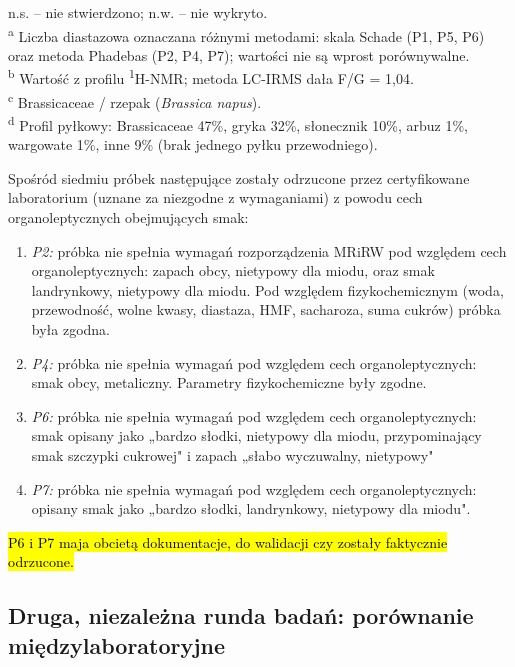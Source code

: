 \documentclass[12pt,a4paper]{article}
\begin{document}
\begin{table}[h!]
\vspace{2pt}
{\footnotesize
\begin{flushleft}
n.s. -- nie stwierdzono; n.w. -- nie wykryto.\\
\textsuperscript{a} Liczba diastazowa oznaczana różnymi metodami: skala Schade (P1, P5, P6)
oraz metoda Phadebas (P2, P4, P7); wartości nie są wprost porównywalne.\\
\textsuperscript{b} Wartość z profilu \textsuperscript{1}H-NMR; metoda LC-IRMS dała F/G = 1,04.\\
\textsuperscript{c} Brassicaceae / rzepak (\textit{Brassica napus}).\\
\textsuperscript{d} Profil pyłkowy: Brassicaceae 47\%, gryka 32\%, słonecznik 10\%,
arbuz 1\%, wargowate 1\%, inne 9\% (brak jednego pyłku przewodniego).
\end{flushleft}
}
\end{table}
\FloatBarrier 

Spośród siedmiu próbek następujące zostały odrzucone przez certyfikowane laboratorium (uznane za niezgodne z wymaganiami) z powodu cech organoleptycznych obejmujących smak:
\begin{enumerate}
  \item \textit{P2:} próbka nie spełnia wymagań rozporządzenia MRiRW pod względem cech organoleptycznych: zapach obcy, nietypowy dla miodu, oraz smak landrynkowy, nietypowy dla miodu. Pod względem fizykochemicznym (woda, przewodność, wolne kwasy, diastaza, HMF, sacharoza, suma cukrów) próbka była zgodna.
  \item \textit{P4:} próbka nie spełnia wymagań pod względem cech organoleptycznych: smak obcy, metaliczny. Parametry fizykochemiczne były zgodne.
  \item \textit{P6:} próbka nie spełnia wymagań pod względem cech organoleptycznych: smak opisany jako „bardzo słodki, nietypowy dla miodu, przypominający smak szczypki cukrowej" i zapach „słabo wyczuwalny, nietypowy"
  \item \textit{P7:} próbka nie spełnia wymagań pod względem cech organoleptycznych: opisany smak jako „bardzo słodki, landrynkowy, nietypowy dla miodu".  
\end{enumerate}
\hl{P6 i P7 maja obcietą dokumentacje, do walidacji czy zostały faktycznie odrzucone.}

\subsection{Druga, niezależna runda badań: porównanie międzylaboratoryjne}
\label{sub:interlab_metody}
\end{document}

